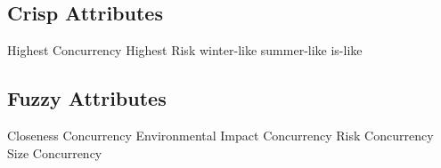 
\subsection{Crisp Attributes}
Highest Concurrency
Highest Risk %
winter-like
summer-like
is-like

\subsection{Fuzzy Attributes}
Closeness Concurrency
Environmental Impact Concurrency
Risk Concurrency %
Size Concurrency %
